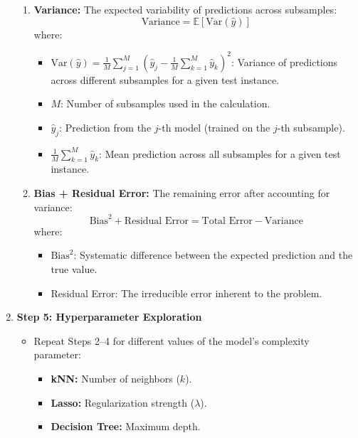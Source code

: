 \documentclass[a4paper,10pt]{article}
\begin{document}
\begin{enumerate}
\begin{enumerate}
    \item \textbf{Variance:} The expected variability of predictions across subsamples:
    \[
    \text{Variance} = \mathbb{E}\left[\text{Var}(\hat{y})\right]
    \]
    where:
    \begin{itemize}
    \item \(\text{Var}(\hat{y}) = \frac{1}{M} \sum_{j=1}^{M} \left(\hat{y}_j - \frac{1}{M} \sum_{k=1}^{M} \hat{y}_k \right)^2\): 
    Variance of predictions across different subsamples for a given test instance.
    \item \(M\): Number of subsamples used in the calculation.
    \item \(\hat{y}_j\): Prediction from the \(j\)-th model (trained on the \(j\)-th subsample).
    \item \(\frac{1}{M} \sum_{k=1}^{M} \hat{y}_k\): Mean prediction across all subsamples for a given test instance.
\end{itemize}


    \item \textbf{Bias + Residual Error:} The remaining error after accounting for variance:
    \[
    \text{Bias}^2 + \text{Residual Error} = \text{Total Error} - \text{Variance}
    \]
    where:
    \begin{itemize}
        \item \(\text{Bias}^2\): Systematic difference between the expected prediction and the true value.
        \item Residual Error: The irreducible error inherent to the problem.
    \end{itemize}
\end{enumerate}


    \item \textbf{Step 5: Hyperparameter Exploration}
    \begin{itemize}
        \item Repeat Steps 2--4 for different values of the model's complexity parameter:
        \begin{itemize}
            \item \textbf{kNN:} Number of neighbors (\(k\)).
            \item \textbf{Lasso:} Regularization strength (\(\lambda\)).
            \item \textbf{Decision Tree:} Maximum depth.
        \end{itemize}
    \end{itemize}
    
\end{enumerate}
    
\end{document}

